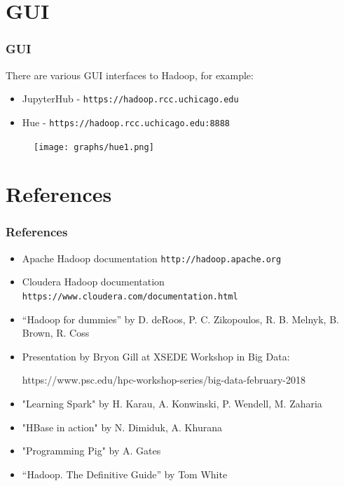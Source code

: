 \documentclass{beamer}
\begin{document}
\section{GUI}
\begin{frame}[fragile]
  \frametitle{GUI}
  There are various GUI interfaces to Hadoop, for example:
  \begin{itemize}
    \item JupyterHub - {\color{mycolorcli}\verb|https://hadoop.rcc.uchicago.edu|}
    \item Hue - {\color{mycolorcli}\verb|https://hadoop.rcc.uchicago.edu:8888|}
    \end{itemize}
 \begin{figure}[h]
 \texttt{[image: graphs/hue1.png]}
 \end{figure}

\end{frame}


\section{References}
\begin{frame}[fragile]
 \frametitle{References}
 \begin{itemize}
 \item Apache Hadoop documentation {\color{mycolorcli}\verb|http://hadoop.apache.org|}
 \item Cloudera Hadoop documentation {\color{mycolorcli}\verb|https://www.cloudera.com/documentation.html|}
  \item ``Hadoop for dummies'' by D. deRoos, P. C. Zikopoulos, R. B. Melnyk, B. Brown, R. Coss
  \item Presentation by Bryon Gill at XSEDE Workshop in Big Data: 
{\color{mycolorcli}
  \begin{verbnobox}[\small]
https://www.psc.edu/hpc-workshop-series/big-data-february-2018
  \end{verbnobox}
}
  \item "Learning Spark" by H. Karau, A. Konwinski, P. Wendell, M. Zaharia
  \item "HBase in action" by N. Dimiduk, A. Khurana
  \item "Programming Pig" by A. Gates
  \item ``Hadoop. The Definitive Guide'' by Tom White
 \end{itemize}

\end{frame}
\end{document}
